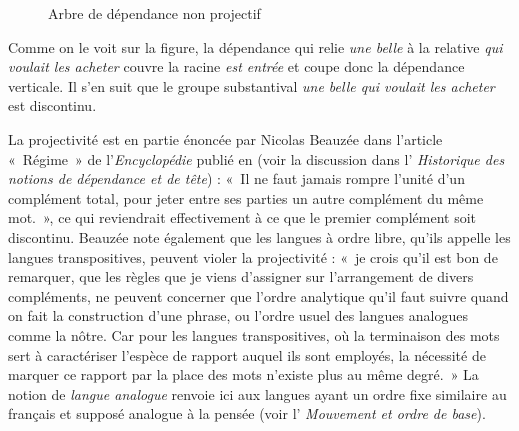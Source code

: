 \begin{figure}
\caption{\label{fig:nonproj-belle}Arbre de dépendance non projectif}
\end{figure}



Comme on le voit sur la figure, la dépendance qui relie \textit{une belle} à la relative \textit{qui voulait les acheter} couvre la racine \textit{est entrée} et coupe donc la dépendance verticale. Il s’en suit que le groupe substantival \textit{une belle qui voulait les acheter} est discontinu.

La projectivité est en partie énoncée par Nicolas Beauzée dans l’article «~Régime~» de l’\textit{Encyclopédie} publié en \citeyear{Beauzée1765} (voir la discussion dans l’ \textit{Historique des notions de dépendance et de tête}) : «~Il ne faut jamais rompre l’unité d’un complément total, pour jeter entre ses parties un autre complément du même mot.~», ce qui reviendrait effectivement à ce que le premier complément soit discontinu. Beauzée note également que les langues à ordre libre, qu'ils appelle les langues transpositives, peuvent violer la projectivité : «~je crois qu’il est bon de remarquer, que les règles que je viens d’assigner sur l’arrangement de divers compléments, ne peuvent concerner que l’ordre analytique qu’il faut suivre quand on fait la construction d’une phrase, ou l’ordre usuel des langues analogues comme la nôtre. Car pour les langues transpositives, où la terminaison des mots sert à caractériser l’espèce de rapport auquel ils sont employés, la nécessité de marquer ce rapport par la place des mots n’existe plus au même degré.~» La notion de \textit{langue analogue} renvoie ici aux langues ayant un ordre fixe similaire au français et supposé analogue à la pensée (voir l’ \textit{Mouvement et ordre de base}).


